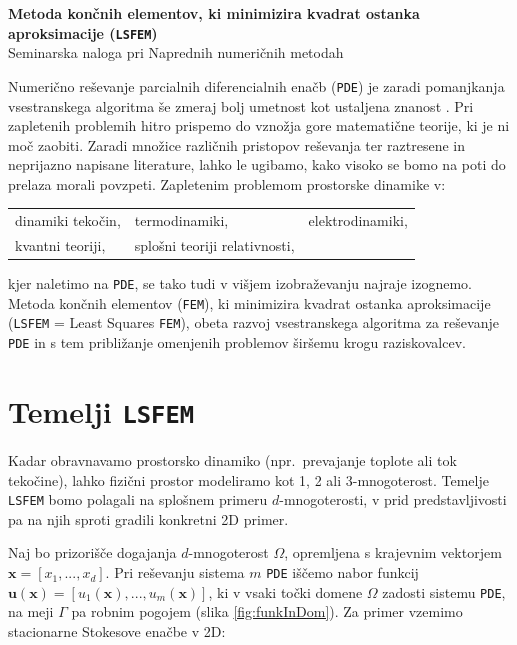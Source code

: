 \begin{center}
	\textbf{\LARGE{Metoda končnih elementov, ki minimizira kvadrat ostanka aproksimacije (\texttt{LSFEM})}}\\[0.25cm]
	\large{Seminarska naloga pri Naprednih numeričnih metodah}\\[0.7cm]
\end{center}

Numerično reševanje parcialnih diferencialnih enačb (\texttt{PDE}) je zaradi pomanjkanja vsestranskega algoritma še zmeraj bolj umetnost kot ustaljena znanost \cite{JiangB-LSFEM}. Pri zapletenih problemih hitro prispemo do vznožja gore matematične teorije, ki je ni moč zaobiti. Zaradi množice različnih pristopov reševanja ter raztresene in neprijazno napisane literature, lahko le ugibamo, kako visoko se bomo na poti do prelaza morali povzpeti. Zapletenim problemom prostorske dinamike v:
\begin{center}
	\begin{tabular}[h]{lll}
		\tabitem dinamiki tekočin,\hspace{1cm}	&	\tabitem termodinamiki,\hspace{2.5cm}	&	\tabitem elektrodinamiki,\\
		\tabitem kvantni teoriji,	&	\tabitem splošni teoriji relativnosti,&	\\
	\end{tabular}
\end{center}
kjer naletimo na \texttt{PDE}, se tako tudi v višjem izobraževanju najraje izognemo. Metoda končnih elementov (\texttt{FEM}), ki minimizira kvadrat ostanka aproksimacije (\texttt{LSFEM} = Least Squares \texttt{FEM}), obeta razvoj vsestranskega algoritma za reševanje \texttt{PDE} in s tem približanje omenjenih problemov širšemu krogu raziskovalcev.

\section{Temelji \texttt{LSFEM}}
Kadar obravnavamo prostorsko dinamiko (npr.\ prevajanje toplote ali tok tekočine), lahko fizični prostor modeliramo kot 1, 2 ali 3-mnogoterost. Temelje \texttt{LSFEM} bomo polagali na splošnem primeru $d$-mnogoterosti, v prid predstavljivosti pa na njih sproti gradili konkretni 2D primer.

Naj bo prizorišče dogajanja $d$-mnogoterost $\Omega$, opremljena s krajevnim vektorjem $\mathbf{x} = [x_1, ..., x_d]$. Pri reševanju sistema $m$ \texttt{PDE} iščemo nabor funkcij $\mathbf{u}(\mathbf{x}) =  [u_1(\mathbf{x}), ..., u_m(\mathbf{x})]$, ki v vsaki točki domene $\Omega$ zadosti sistemu \texttt{PDE}, na meji $\Gamma$ pa robnim pogojem (slika \ref{fig:funkInDom}). Za primer vzemimo stacionarne Stokesove enačbe v 2D:

